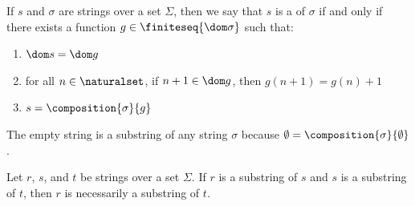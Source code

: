 \begin{dfn}[Substring]
     \label{dfn:metatheory-substring}
    If \( s \) and \( \sigma \) are strings over a set \( \Sigma \), then we say that
    \( s \) is a  of \( \sigma \)
    if and only if there exists a function \( g \in \finiteseq{\dom \sigma} \) such that:
    \begin{enumerate}[topsep=2pt,label=\textup{\texttt{(\alph*)}}]
        \item \( \dom s = \dom g \)
        \item for all \( n \in \naturalset \), if \( n + 1 \in \dom g \), then \( g(n + 1) = g(n) + 1 \)
        \item \( s = \composition{\sigma}{g} \)
    \end{enumerate}
\end{dfn}

\begin{cor}
     \label{cor:metatheory-the-empty-string-is-a-substring-of-any-string}
    The empty string is a substring of any string \( \sigma \) because \( \emptyset = \composition{\sigma}{\emptyset} \).
\end{cor}

\begin{thm}
     \label{thm:metatheory-transitivity-of-substrings}
    Let \( r \), \( s \), and \( t \) be strings over a set \( \Sigma \).
    If \( r \) is a substring of \( s \) and \( s \) is a substring of \( t \), then \( r \) is necessarily a substring of \( t \).
\end{thm}

